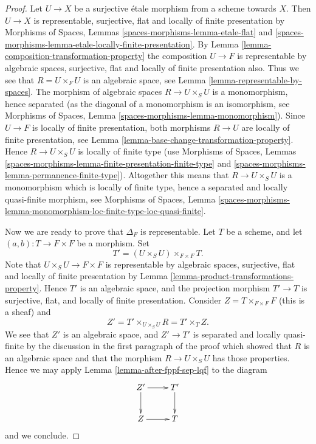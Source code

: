 \begin{proof}
Let $U \to X$ be a surjective \'etale morphism from a scheme towards $X$.
Then $U \to X$ is representable, surjective, flat and
locally of finite presentation by
Morphisms of Spaces,
Lemmas \ref{spaces-morphisms-lemma-etale-flat} and
\ref{spaces-morphisms-lemma-etale-locally-finite-presentation}.
By
Lemma \ref{lemma-composition-transformation-property}
the composition $U \to F$ is representable by algebraic spaces,
surjective, flat and locally of finite presentation also.
Thus we see that $R = U \times_F U$ is an algebraic space, see
Lemma \ref{lemma-representable-by-spaces}.
The morphism of algebraic spaces $R \to U \times_S U$ is
a monomorphism, hence separated (as the diagonal of a monomorphism
is an isomorphism, see
Morphisms of Spaces,
Lemma \ref{spaces-morphisms-lemma-monomorphism}).
Since $U \to F$ is locally of finite presentation, both
morphisms $R \to U$ are locally of finite presentation, see
Lemma \ref{lemma-base-change-transformation-property}.
Hence $R \to U \times_S U$ is locally of finite type (use
Morphisms of Spaces,
Lemmas \ref{spaces-morphisms-lemma-finite-presentation-finite-type} and
\ref{spaces-morphisms-lemma-permanence-finite-type}).
Altogether this means that
$R \to U \times_S U$ is a monomorphism which is locally of finite
type, hence a separated and locally quasi-finite morphism, see
Morphisms of Spaces, Lemma
\ref{spaces-morphisms-lemma-monomorphism-loc-finite-type-loc-quasi-finite}.

\medskip\noindent
Now we are ready to prove that $\Delta_F$ is representable.
Let $T$ be a scheme, and let $(a, b) : T \to F \times F$ be a morphism.
Set
$$
T' = (U \times_S U) \times_{F \times F} T.
$$
Note that $U \times_S U \to F \times F$ is
representable by algebraic spaces, surjective, flat and
locally of finite presentation by
Lemma \ref{lemma-product-transformations-property}.
Hence $T'$ is an algebraic space, and the projection morphism
$T' \to T$ is surjective, flat, and locally of finite presentation.
Consider $Z = T \times_{F \times F} F$ (this is a sheaf) and
$$
Z' = T' \times_{U \times_S U} R
= T' \times_T Z.
$$
We see that $Z'$ is an algebraic space, and
$Z' \to T'$ is separated and locally quasi-finite by the
discussion in the first paragraph of the proof which showed that $R$ is
an algebraic space and that the
morphism $R \to U \times_S U$ has those properties.
Hence we may apply
Lemma \ref{lemma-after-fppf-sep-lqf}
to the diagram
$$
\xymatrix{
Z' \ar[r] \ar[d] & T' \ar[d] \\
Z \ar[r] & T
}
$$
and we conclude.
\end{proof}











